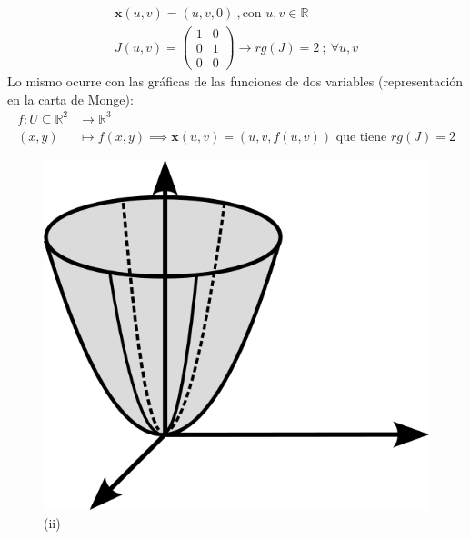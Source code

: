 \begin{mybox}
        \begin{gather*}
        \mathbf{x}(u,v)=(u,v,0) \ , \text{con }u,v \in \mathbb{R}\\
        J(u,v)=\left ( \begin{array}{cc}
             1&0  \\
             0&1  \\
             0&0
        \end{array} \right ) \longrightarrow rg(J)=2 \ ; \ \forall u,v 
        \end{gather*}
        Lo mismo ocurre con las gráficas de las funciones de dos variables (representación en la carta de Monge):
        \begin{align*}
            f:U\subseteq \mathbb{R}^2 &\longrightarrow\mathbb{R}^3\\
                                 (x,y)&\longmapsto f(x,y)  \implies \mathbf{x}(u,v)=(u,v,f(u,v)) \text{ que tiene } rg(J)=2
        \end{align*}
            \begin{figure}
             \centering
             \includegraphics[scale=.18]{FOTOS/ejemplo2_A_2.png}
             \caption*{(ii)}

\end{figure}
\end{mybox}
